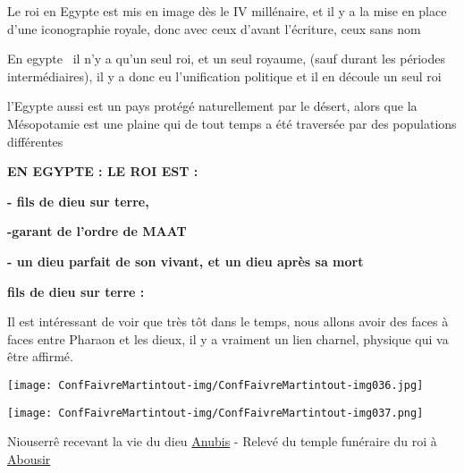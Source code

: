 \documentclass[a4paper]{article}
\begin{document}
\bigskip

{
Le roi en Egypte est mis en image dès le IV millénaire, et il y a la
mise en place d'une iconographie royale, donc avec ceux d'avant
l'écriture, ceux sans nom}


\bigskip


\bigskip

{
En egypte \ il n'y a qu'un seul roi, et un seul royaume, (sauf durant
les périodes intermédiaires), il y a donc eu l'unification politique et
il en découle un seul roi}

{
l'Egypte aussi est un pays protégé naturellement par le désert, alors
que la Mésopotamie est une plaine qui de tout temps a été traversée par
des populations différentes}


\bigskip


\bigskip


\bigskip

{
\textbf{EN EGYPTE : LE ROI EST :}}


\bigskip

{
\textbf{{}- fils de dieu sur terre,}}

{
\textbf{{}-garant de l'ordre de MAAT}}

{
\textbf{{}- un dieu parfait de son vivant, et un dieu après sa mort}}


\bigskip


\bigskip

{
\textbf{fils de dieu sur terre : }}


\bigskip

{
Il est intéressant de voir que très tôt dans le temps, nous allons avoir
des faces à faces entre Pharaon et les dieux, il y a vraiment un lien
charnel, physique qui va être affirmé.}


\bigskip


\texttt{[image: ConfFaivreMartintout-img/ConfFaivreMartintout-img036.jpg]}



\bigskip


\texttt{[image: ConfFaivreMartintout-img/ConfFaivreMartintout-img037.png]}


{
Niouserrê recevant la vie du dieu
\href{http://fr.wikipedia.org/wiki/Anubis}{\textcolor[rgb]{0.0,0.21960784,0.62352943}{Anubis}}
- Relevé du temple funéraire du roi à
\href{http://fr.wikipedia.org/wiki/Abousir}{\textcolor[rgb]{0.0,0.21960784,0.62352943}{Abousir}}}
\end{document}
